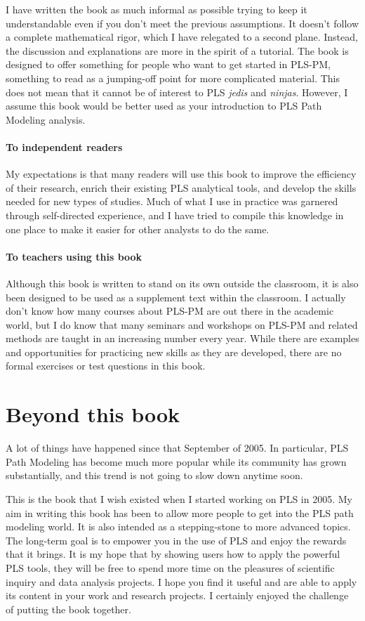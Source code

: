 \documentclass[12pt]{book}\usepackage{graphicx, color}
\begin{document}
I have written the book as much informal as possible trying to keep it understandable even if you don't meet the previous assumptions. It doesn't follow a complete mathematical rigor, which I have relegated to a second plane. Instead, the discussion and explanations are more in the spirit of a tutorial. The book is designed to offer something for people who want to get started in PLS-PM, something to read as a jumping-off point for more complicated material. This does not mean that it cannot be of interest to PLS \textit{jedis} and \textit{ninjas}. However, I assume this book would be better used as your introduction to PLS Path Modeling analysis.

\paragraph{To independent readers}
My expectations is that many readers will use this book to improve the efficiency of their research, enrich their existing PLS analytical tools, and develop the skills needed for new types of studies. Much of what I use in practice was garnered through self-directed experience, and I have tried to compile this knowledge in one place to make it easier for other analysts to do the same.

\paragraph{To teachers using this book}
Although this book is written to stand on its own outside the classroom, it is also been designed to be used as a supplement text within the classroom. I actually don't know how many courses about PLS-PM are out there in the academic world, but I do know that many seminars and workshops on PLS-PM and related methods are taught in an increasing number every year. While there are examples and opportunities for practicing new skills as they are developed, there are no formal exercises or test questions in this book.




\section*{Beyond this book}
A lot of things have happened since that September of 2005. In particular, PLS Path Modeling has become much more popular while its community has grown substantially, and this trend is not going to slow down anytime soon. 

This is the book that I wish existed when I started working on PLS in 2005. My aim in writing this book has been to allow more people to get into the PLS path modeling world. It is also intended as a stepping-stone to more advanced topics. The long-term goal is to empower you in the use of PLS and enjoy the rewards that it brings. It is my hope that by showing users how to apply the powerful PLS tools, they will be free to spend more time on the pleasures of scientific inquiry and data analysis projects. I hope you find it useful and are able to apply its content in your work and research projects. I certainly enjoyed the challenge of putting the book together.
\end{document}
